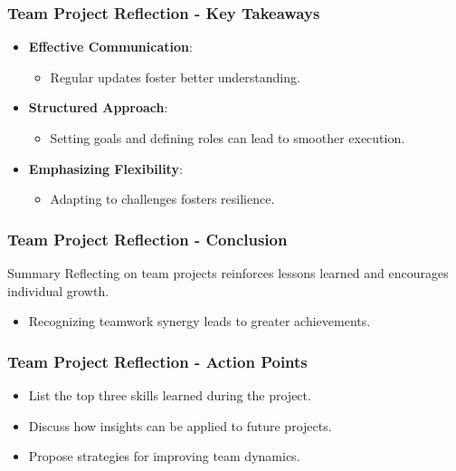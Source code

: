 \documentclass[aspectratio=169]{beamer}
\begin{document}
\begin{frame}[fragile]
    \frametitle{Team Project Reflection - Key Takeaways}
    \begin{itemize}
        \item \textbf{Effective Communication}:
            \begin{itemize}
                \item Regular updates foster better understanding.
            \end{itemize}
        \item \textbf{Structured Approach}:
            \begin{itemize}
                \item Setting goals and defining roles can lead to smoother execution.
            \end{itemize}
        \item \textbf{Emphasizing Flexibility}:
            \begin{itemize}
                \item Adapting to challenges fosters resilience.
            \end{itemize}
    \end{itemize}
\end{frame}

\begin{frame}[fragile]
    \frametitle{Team Project Reflection - Conclusion}
    \begin{block}{Summary}
        Reflecting on team projects reinforces lessons learned and encourages individual growth.
    \end{block}
    \begin{itemize}
        \item Recognizing teamwork synergy leads to greater achievements.
    \end{itemize}
\end{frame}

\begin{frame}[fragile]
    \frametitle{Team Project Reflection - Action Points}
    \begin{itemize}
        \item List the top three skills learned during the project.
        \item Discuss how insights can be applied to future projects.
        \item Propose strategies for improving team dynamics.
    \end{itemize}
\end{frame}
\end{document}
